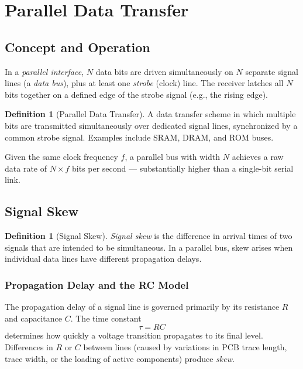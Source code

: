 \documentclass[11pt, a4paper, notitlepage]{report}
\theoremstyle{definition}
\newtheorem{definition}[theorem]{Definition}
\theoremstyle{remark}
\theoremstyle{definition}
\begin{document}
\section{Parallel Data Transfer}
\label{ch:parallel}

\subsection{Concept and Operation}
\label{sec:parallel-concept}

In a \emph{parallel interface}, $N$ data bits are driven simultaneously on $N$ separate signal lines (a \emph{data bus}), plus at least one \emph{strobe} (clock) line. The receiver latches all $N$ bits together on a defined edge of the strobe signal (e.g., the rising edge).

\begin{definition}[Parallel Data Transfer]
  \label{def:parallel}
  A data transfer scheme in which multiple bits are transmitted simultaneously over dedicated signal lines, synchronized by a common strobe signal. Examples include SRAM, DRAM, and ROM buses.
\end{definition}

Given the same clock frequency $f$, a parallel bus with width $N$ achieves a raw data rate of $N \times f$ bits per second — substantially higher than a single-bit serial link.

\subsection{Signal Skew}
\label{sec:skew}

\begin{definition}[Signal Skew]
  \label{def:skew}
  \emph{Signal skew} is the difference in arrival times of two signals that are intended to be simultaneous. In a parallel bus, skew arises when individual data lines have different propagation delays.
\end{definition}

\subsubsection{Propagation Delay and the RC Model}

The propagation delay of a signal line is governed primarily by its resistance $R$ and capacitance $C$. The time constant
\[
  \tau = RC
\]
determines how quickly a voltage transition propagates to its final level. Differences in $R$ or $C$ between lines (caused by variations in PCB trace length, trace width, or the loading of active components) produce \emph{skew}.
\end{document}
